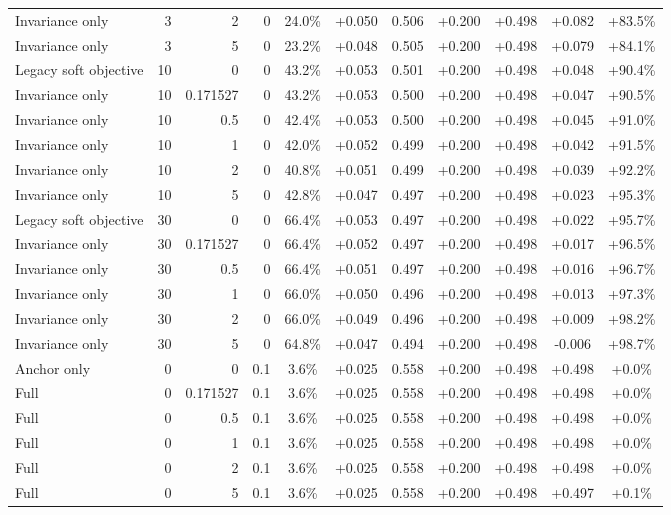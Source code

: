 \begin{table}[htbp]
\begin{tabular}{lrrrccccccc}
Invariance only & 3 & 2 & 0 & 24.0\% & +0.050 & 0.506 & +0.200 & +0.498 & +0.082 & +83.5\% \\
Invariance only & 3 & 5 & 0 & 23.2\% & +0.048 & 0.505 & +0.200 & +0.498 & +0.079 & +84.1\% \\
Legacy soft objective & 10 & 0 & 0 & 43.2\% & +0.053 & 0.501 & +0.200 & +0.498 & +0.048 & +90.4\% \\
Invariance only & 10 & 0.171527 & 0 & 43.2\% & +0.053 & 0.500 & +0.200 & +0.498 & +0.047 & +90.5\% \\
Invariance only & 10 & 0.5 & 0 & 42.4\% & +0.053 & 0.500 & +0.200 & +0.498 & +0.045 & +91.0\% \\
Invariance only & 10 & 1 & 0 & 42.0\% & +0.052 & 0.499 & +0.200 & +0.498 & +0.042 & +91.5\% \\
Invariance only & 10 & 2 & 0 & 40.8\% & +0.051 & 0.499 & +0.200 & +0.498 & +0.039 & +92.2\% \\
Invariance only & 10 & 5 & 0 & 42.8\% & +0.047 & 0.497 & +0.200 & +0.498 & +0.023 & +95.3\% \\
Legacy soft objective & 30 & 0 & 0 & 66.4\% & +0.053 & 0.497 & +0.200 & +0.498 & +0.022 & +95.7\% \\
Invariance only & 30 & 0.171527 & 0 & 66.4\% & +0.052 & 0.497 & +0.200 & +0.498 & +0.017 & +96.5\% \\
Invariance only & 30 & 0.5 & 0 & 66.4\% & +0.051 & 0.497 & +0.200 & +0.498 & +0.016 & +96.7\% \\
Invariance only & 30 & 1 & 0 & 66.0\% & +0.050 & 0.496 & +0.200 & +0.498 & +0.013 & +97.3\% \\
Invariance only & 30 & 2 & 0 & 66.0\% & +0.049 & 0.496 & +0.200 & +0.498 & +0.009 & +98.2\% \\
Invariance only & 30 & 5 & 0 & 64.8\% & +0.047 & 0.494 & +0.200 & +0.498 & -0.006 & +98.7\% \\
Anchor only & 0 & 0 & 0.1 & 3.6\% & +0.025 & 0.558 & +0.200 & +0.498 & +0.498 & +0.0\% \\
Full & 0 & 0.171527 & 0.1 & 3.6\% & +0.025 & 0.558 & +0.200 & +0.498 & +0.498 & +0.0\% \\
Full & 0 & 0.5 & 0.1 & 3.6\% & +0.025 & 0.558 & +0.200 & +0.498 & +0.498 & +0.0\% \\
Full & 0 & 1 & 0.1 & 3.6\% & +0.025 & 0.558 & +0.200 & +0.498 & +0.498 & +0.0\% \\
Full & 0 & 2 & 0.1 & 3.6\% & +0.025 & 0.558 & +0.200 & +0.498 & +0.498 & +0.0\% \\
Full & 0 & 5 & 0.1 & 3.6\% & +0.025 & 0.558 & +0.200 & +0.498 & +0.497 & +0.1\% \\

\end{tabular}
\end{table}
